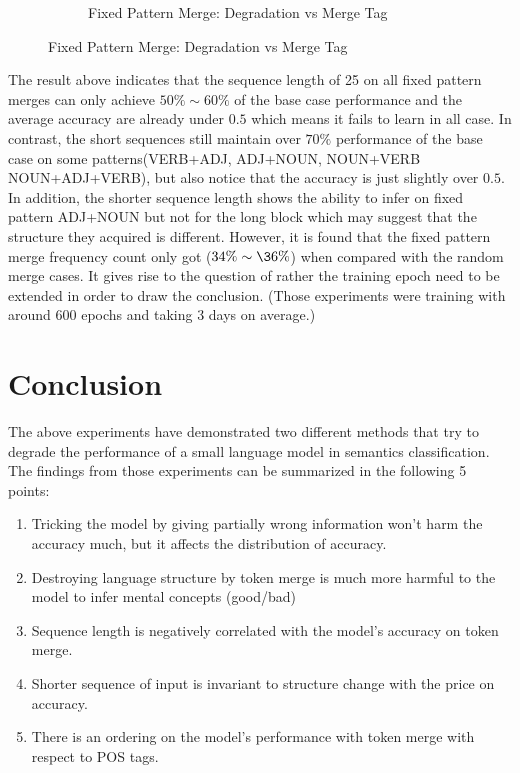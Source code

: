 \documentclass[12pt]{article}
\begin{document}
\begin{figure} [!h]
\begin{center}
\begin{subfigure}[h]{0.4\linewidth}
\caption{Fixed Pattern Merge: Degradation vs Merge Tag}
\label{fig:fixmergeScatter2}
\end{subfigure}
\end{center}
\end{figure}

The result above indicates that the sequence length of 25 on all fixed pattern merges can only achieve $50\%\sim60\%$ of the base case performance and the average accuracy are already under $0.5$ which means it fails to learn in all case. In contrast, the short sequences still maintain over $70\%$ performance of the base case on some patterns(VERB+ADJ, ADJ+NOUN, NOUN+VERB NOUN+ADJ+VERB), but also notice that the accuracy is just slightly over $0.5$. In addition, the shorter sequence length shows the ability to infer on fixed pattern ADJ+NOUN but not for the long block which may suggest that the structure they acquired is different. However, it is found that the fixed pattern merge frequency count only got ($34\%\sim\36\%$) when compared with the random merge cases. It gives rise to the question of rather the training epoch need to be extended in order to draw the conclusion. (Those experiments were training with around 600 epochs and taking 3 days on average.)   

\section{Conclusion}

The above experiments have demonstrated two different methods that try to degrade the performance of a small language model in semantics classification. The findings from those experiments can be summarized in the following 5 points:
\begin{enumerate}
    \item Tricking the model by giving partially wrong information won't harm the accuracy much, but it affects the distribution of accuracy.
    \item Destroying language structure by token merge is much more harmful to the model to infer mental concepts (good/bad)
    \item Sequence length is negatively correlated with the model's accuracy on token merge.
    \item Shorter sequence of input is invariant to structure change with the price on accuracy.
    \item There is an ordering on the model's performance with token merge with respect to POS tags.
\end{enumerate}
\end{document}
